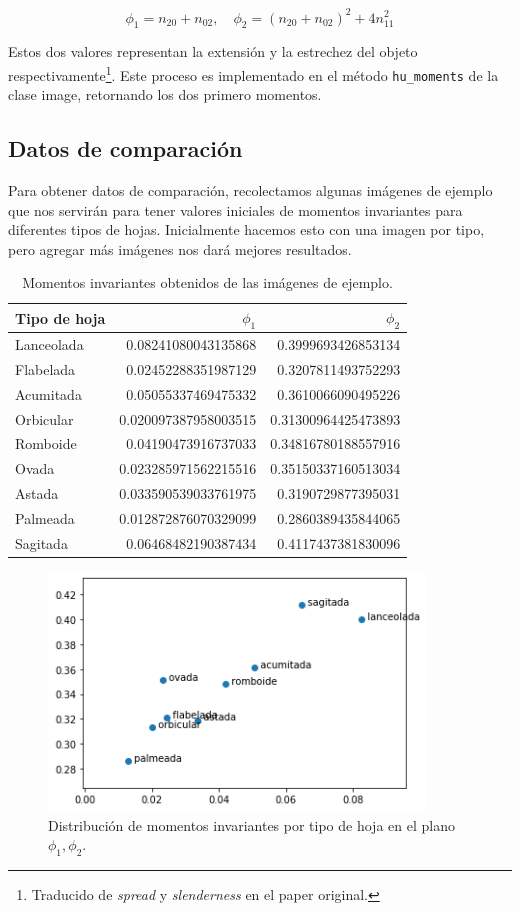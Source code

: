 \documentclass[letter]{article}
\begin{document}
$$ \phi_1 = n_{20} + n_{02}, \quad \phi_2 = (n_{20} + n_{02})^2 + 4n_{11}^2 $$

Estos dos valores representan la extensión y la estrechez del objeto
respectivamente\footnote{Traducido de \emph{spread} y \emph{slenderness} en el paper original.}.
Este proceso es implementado en el método \texttt{hu\_moments} de la clase image,
retornando los dos primero momentos.

\subsection{Datos de comparación}
\label{sec:orgc60f43d}
Para obtener datos de comparación, recolectamos algunas imágenes de ejemplo que
nos servirán para tener valores iniciales de momentos invariantes para
diferentes tipos de hojas. Inicialmente hacemos esto con una imagen por tipo,
pero agregar más imágenes nos dará mejores resultados.

\begin{table}[htbp]
\caption{Momentos invariantes obtenidos de las imágenes de ejemplo.}
\centering
\begin{tabular}{lrr}
\hline
Tipo de hoja & \(\phi_1\) & \(\phi_2\)\\
\hline
Lanceolada & 0.08241080043135868 & 0.3999693426853134\\
Flabelada & 0.02452288351987129 & 0.3207811493752293\\
Acumitada & 0.05055337469475332 & 0.3610066090495226\\
Orbicular & 0.020097387958003515 & 0.31300964425473893\\
Romboide & 0.04190473916737033 & 0.34816780188557916\\
Ovada & 0.023285971562215516 & 0.35150337160513034\\
Astada & 0.033590539033761975 & 0.3190729877395031\\
Palmeada & 0.012872876070329099 & 0.2860389435844065\\
Sagitada & 0.06468482190387434 & 0.4117437381830096\\
\hline
\end{tabular}
\end{table}

\begin{figure}[htbp]
\centering
\includegraphics[width=10cm]{./images/moments.jpg}
\caption{Distribución de momentos invariantes por tipo de hoja en el plano \(\phi_1, \phi_2\).}
\end{figure}
\end{document}

